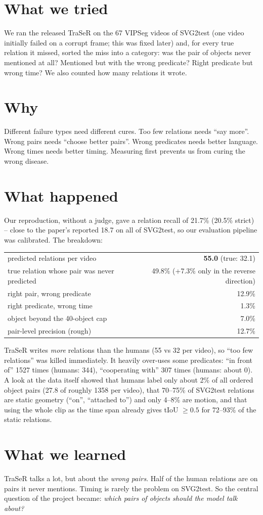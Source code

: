 \documentclass[11pt,openany]{book}
\newcommand{\tsec}{\section*{What we tried}}
\newcommand{\wsec}{\section*{Why}}
\newcommand{\hsec}{\section*{What happened}}
\newcommand{\lsec}{\section*{What we learned}}
\begin{document}
\tsec
We ran the released TraSeR on the 67 VIPSeg videos of SVG2test (one video initially failed on a corrupt frame; this was fixed
later) and, for every true relation it missed, sorted the miss into a category: was the pair of objects never mentioned at all?
Mentioned but with the wrong predicate? Right predicate but wrong time? We also counted how many relations it wrote.

\wsec
Different failure types need different cures. Too few relations needs ``say more''. Wrong pairs needs ``choose better pairs''.
Wrong predicates needs better language. Wrong times needs better timing. Measuring first prevents us from curing the wrong disease.

\hsec
Our reproduction, without a judge, gave a relation recall of 21.7\% (20.5\% strict) -- close to the paper's reported 18.7 on all of
SVG2test, so our evaluation pipeline was calibrated. The breakdown:
\begin{center}
\begin{tabular}{@{}lr@{}}
\toprule
predicted relations per video & \textbf{55.0} (true: 32.1) \\
true relation whose pair was never predicted & 49.8\% (+7.3\% only in the reverse direction) \\
right pair, wrong predicate & 12.9\% \\
right predicate, wrong time & 1.3\% \\
object beyond the 40-object cap & 7.0\% \\
pair-level precision (rough) & 12.7\% \\
\bottomrule
\end{tabular}
\end{center}
TraSeR writes \emph{more} relations than the humans (55 vs 32 per video), so ``too few relations'' was killed immediately. It
heavily over-uses some predicates: ``in front of'' 1527 times (humans: 344), ``cooperating with'' 307 times (humans: about 0).
A look at the data itself showed that humans label only about 2\% of all ordered object pairs (27.8 of roughly 1358 per video),
that 70--75\% of SVG2test relations are static geometry (``on'', ``attached to'') and only 4--8\% are motion, and that using the
whole clip as the time span already gives tIoU $\ge 0.5$ for 72--93\% of the static relations.

\lsec
\begin{keyidea}
TraSeR talks a lot, but about the \emph{wrong pairs}. Half of the human relations are on pairs it never mentions. Timing is
rarely the problem on SVG2test. So the central question of the project became: \emph{which pairs of objects should the model
talk about?}
\end{keyidea}
\end{document}

